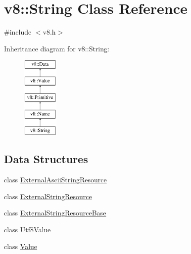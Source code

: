 \hypertarget{classv8_1_1String}{\section{v8\-:\-:String Class Reference}
\label{classv8_1_1String}
}


{\ttfamily \#include $<$v8.\-h$>$}

Inheritance diagram for v8\-:\-:String\-:\begin{figure}[H]
\begin{center}
\leavevmode
\includegraphics[height=4.000000cm]{classv8_1_1String}
\end{center}
\end{figure}
\subsection*{Data Structures}
\begin{DoxyCompactItemize}
\item 
class \hyperlink{classv8_1_1String_1_1ExternalAsciiStringResource}{External\-Ascii\-String\-Resource}
\item 
class \hyperlink{classv8_1_1String_1_1ExternalStringResource}{External\-String\-Resource}
\item 
class \hyperlink{classv8_1_1String_1_1ExternalStringResourceBase}{External\-String\-Resource\-Base}
\item 
class \hyperlink{classv8_1_1String_1_1Utf8Value}{Utf8\-Value}
\item 
class \hyperlink{classv8_1_1String_1_1Value}{Value}
\end{DoxyCompactItemize}
